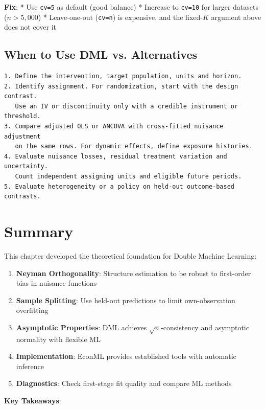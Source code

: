\textbf{Fix}: * Use \texttt{cv=5} as default (good balance) * Increase
to \texttt{cv=10} for larger datasets ($n > 5{,}000$) *
Leave-one-out (\texttt{cv=n}) is expensive, and the fixed-\(K\) argument
above does not cover it

\subsection{When to Use DML vs.
Alternatives}\label{_when_to_use_dml_vs_alternatives}

\begin{verbatim}
1. Define the intervention, target population, units and horizon.
2. Identify assignment. For randomization, start with the design contrast.
   Use an IV or discontinuity only with a credible instrument or threshold.
3. Compare adjusted OLS or ANCOVA with cross-fitted nuisance adjustment
   on the same rows. For dynamic effects, define exposure histories.
4. Evaluate nuisance losses, residual treatment variation and uncertainty.
   Count independent assigning units and eligible future periods.
5. Evaluate heterogeneity or a policy on held-out outcome-based contrasts.
\end{verbatim}

\section{Summary}\label{sec:ch02_summary}

This chapter developed the theoretical foundation for Double Machine
Learning:

\begin{enumerate}
\def\labelenumi{\arabic{enumi}.}
\item
  \textbf{Neyman Orthogonality}: Structure estimation to be robust to
  first-order bias in nuisance functions
\item
  \textbf{Sample Splitting}: Use held-out predictions to limit own-observation overfitting
\item
  \textbf{Asymptotic Properties}: DML achieves \(\sqrt{n}\)-consistency
  and asymptotic normality with flexible ML
\item
  \textbf{Implementation}: EconML provides established tools with
  automatic inference
\item
  \textbf{Diagnostics}: Check first-stage fit quality and compare ML
  methods
\end{enumerate}

\textbf{Key Takeaways}:

